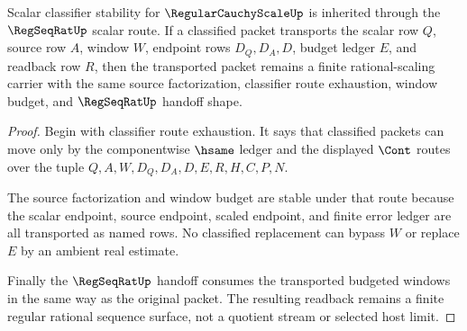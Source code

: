 \begin{theorem}
\label{thm:regular-cauchy-scale-scalar-classifier-stability-obligation}
Scalar classifier stability for $\RegularCauchyScaleUp$ is inherited through the $\RegSeqRatUp$ scalar route. If a classified packet transports the scalar row $Q$, source row $A$, window $W$, endpoint rows $D_Q,D_A,D$, budget ledger $E$, and readback row $R$, then the transported packet remains a finite rational-scaling carrier with the same source factorization, classifier route exhaustion, window budget, and $\RegSeqRatUp$ handoff shape.
\end{theorem}
\begin{proof}
Begin with classifier route exhaustion. It says that classified packets can move only by the componentwise $\hsame$ ledger and the displayed $\Cont$ routes over the tuple $Q,A,W,D_Q,D_A,D,E,R,H,C,P,N$.

The source factorization and window budget are stable under that route because the scalar endpoint, source endpoint, scaled endpoint, and finite error ledger are all transported as named rows. No classified replacement can bypass $W$ or replace $E$ by an ambient real estimate.

Finally the $\RegSeqRatUp$ handoff consumes the transported budgeted windows in the same way as the original packet. The resulting readback remains a finite regular rational sequence surface, not a quotient stream or selected host limit.
\end{proof}

